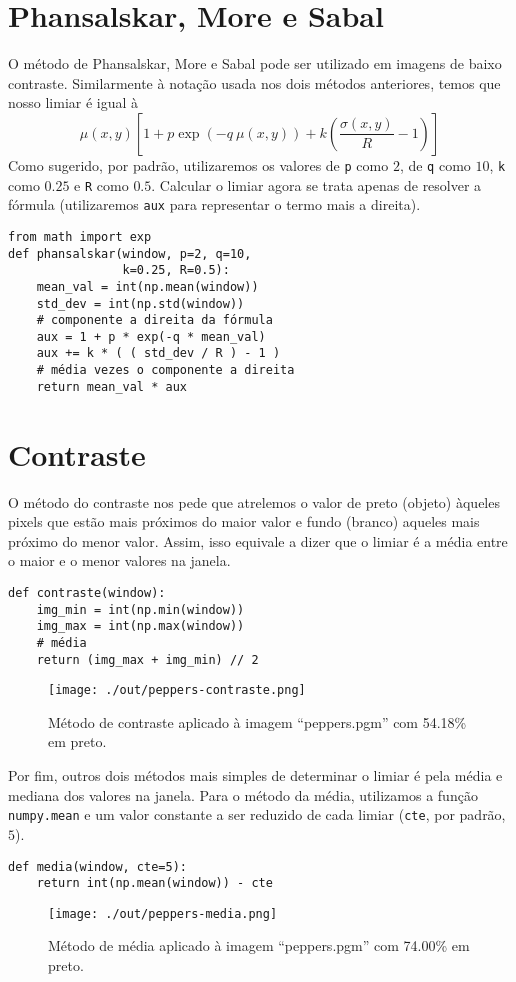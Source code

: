 \documentclass[twocolumn, 10pt]{article}
\begin{document}
\section*{Phansalskar, More e Sabal}
\label{sec:org0007126}
O método de Phansalskar, More e Sabal pode ser utilizado em imagens de baixo contraste.
Similarmente à notação usada nos dois métodos anteriores, temos que nosso limiar é igual à
\[\mu(x, y)\left[1+p \exp (-q\ \mu(x, y))+k\left(\frac{\sigma(x, y)}{R}-1\right)\right] \]
Como sugerido, por padrão, utilizaremos os valores de \texttt{p} como \(2\), de \texttt{q} como \(10\), \texttt{k} como \(0.25\) e \texttt{R} como \(0.5\).
Calcular o limiar agora se trata apenas de resolver a fórmula (utilizaremos \texttt{aux} para representar o termo mais a direita).
\begin{verbatim}
from math import exp
def phansalskar(window, p=2, q=10,
                k=0.25, R=0.5):
    mean_val = int(np.mean(window))
    std_dev = int(np.std(window))
    # componente a direita da fórmula
    aux = 1 + p * exp(-q * mean_val)
    aux += k * ( ( std_dev / R ) - 1 )
    # média vezes o componente a direita
    return mean_val * aux
\end{verbatim}
\section*{Contraste}
\label{sec:org94633de}
O método do contraste nos pede que atrelemos o valor de preto (objeto) àqueles pixels que estão mais próximos do maior valor e fundo (branco) aqueles mais próximo do menor valor.
Assim, isso equivale a dizer que o limiar é a média entre o maior e o menor valores na janela.
\begin{verbatim}
def contraste(window):
    img_min = int(np.min(window))
    img_max = int(np.max(window))
    # média
    return (img_max + img_min) // 2
\end{verbatim}
\begin{figure}[htbp]
\centering
\texttt{[image: ./out/peppers-contraste.png]}
\caption{Método de contraste aplicado à imagem ``peppers.pgm'' com  54.18\% em preto.}
\end{figure}

Por fim, outros dois métodos mais simples de determinar o limiar é pela média e mediana dos valores na janela.
Para o método da média, utilizamos a função \texttt{numpy.mean} e um valor constante a ser reduzido de cada limiar (\texttt{cte}, por padrão, \(5\)).
\begin{verbatim}
def media(window, cte=5):
    return int(np.mean(window)) - cte
\end{verbatim}
\begin{figure}[htbp]
\centering
\texttt{[image: ./out/peppers-media.png]}
\caption{Método de média aplicado à imagem ``peppers.pgm'' com 74.00\% em preto.}
\end{figure}
\end{document}
